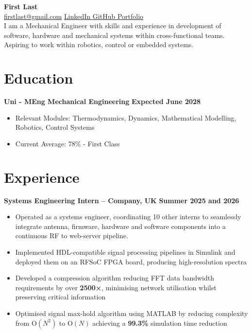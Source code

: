 \documentclass[a4paper,10pt]{article} %
\begin{document}
\pagestyle{empty}
\begin{center}
    {\huge\textbf{First Last}} \\
    \href{mailto:firstlast@gmail.com}{firstlast@gmail.com} \textbar{} \href{https://www.linkedin.com/in/firstlast}{LinkedIn \faLinkedinSquare} \textbar{} \href{https://github.com/firstlast}{GitHub \faGithub} \textbar{} \href{https://firstlast.github.io/Portfolio/}{Portfolio \faGlobe} \\
    \vspace{0.25cm}
    {\textrm{I am a Mechanical Engineer with skills and experience in development of software, hardware and mechanical systems within cross-functional teams. Aspiring to work within robotics, control or embedded systems.}}
\end{center}
\vspace{-0.75cm}
\section*{Education}
\noindent\textbf{Uni - MEng Mechanical Engineering} \hfill \textbf{Expected June 2028}
\begin{itemize}
    \item Relevant Modules: Thermodynamics, Dynamics, Mathematical Modelling, Robotics, Control Systems
    \item Current Average: 78\% - First Class
\end{itemize}

\vspace{-0.5cm}
\section*{Experience}
\noindent\textbf{Systems Engineering Intern – Company, UK} \hfill \textbf{Summer 2025 and 2026}
\begin{itemize}
    \item Operated as a systems engineer, coordinating 10 other interns to seamlessly integrate antenna, firmware, hardware and software components into a continuous RF to web-server pipeline.
    \item Implemented HDL-compatible signal processing pipelines in Simulink and deployed them on an RFSoC FPGA board, producing high-resolution spectra
    \item Developed a compression algorithm reducing FFT data bandwidth requirements by over \textbf{2500×}, minimising network utilisation whilst preserving critical information
    \item Optimised signal max-hold algorithm using MATLAB by reducing complexity from O$(N^2)$ to O$(N)$ achieving a \textbf{99.3\%} simulation time reduction
   
\end{itemize}
\vspace{-0.75em}
\end{document}
